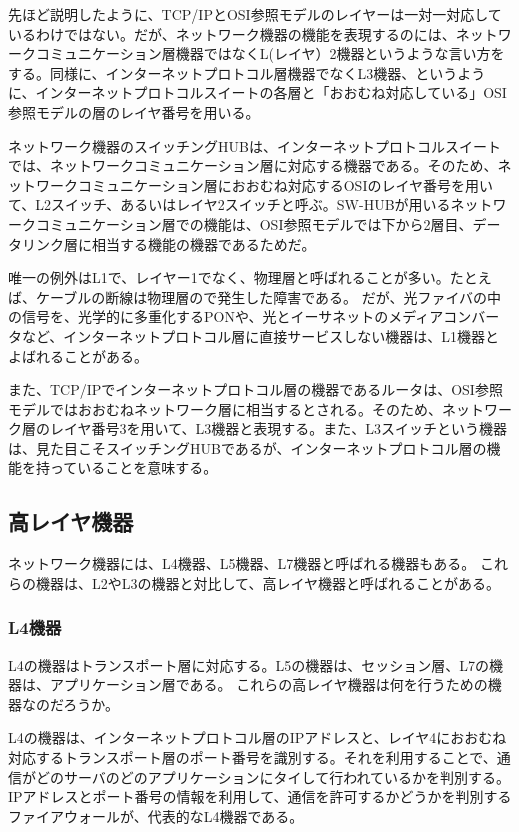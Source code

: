 先ほど説明したように、TCP/IPとOSI参照モデルのレイヤーは一対一対応しているわけではない。だが、ネットワーク機器の機能を表現するのには、ネットワークコミュニケーション層機器ではなくL(レイヤ）2機器というような言い方をする。同様に、インターネットプロトコル層機器でなくL3機器、というように、インターネットプロトコルスイートの各層と「おおむね対応している」OSI参照モデルの層のレイヤ番号を用いる。

ネットワーク機器のスイッチングHUBは、インターネットプロトコルスイートでは、ネットワークコミュニケーション層に対応する機器である。そのため、ネットワークコミュニケーション層におおむね対応するOSIのレイヤ番号を用いて、L2スイッチ、あるいはレイヤ2スイッチと呼ぶ。SW-HUBが用いるネットワークコミュニケーション層での機能は、OSI参照モデルでは下から2層目、データリンク層に相当する機能の機器であるためだ。

唯一の例外はL1で、レイヤー1でなく、物理層と呼ばれることが多い。たとえば、ケーブルの断線は物理層ので発生した障害である。
だが、光ファイバの中の信号を、光学的に多重化するPONや、光とイーサネットのメディアコンバータなど、インターネットプロトコル層に直接サービスしない機器は、L1機器とよばれることがある。

また、TCP/IPでインターネットプロトコル層の機器であるルータは、OSI参照モデルではおおむねネットワーク層に相当するとされる。そのため、ネットワーク層のレイヤ番号3を用いて、L3機器と表現する。また、L3スイッチという機器は、見た目こそスイッチングHUBであるが、インターネットプロトコル層の機能を持っていることを意味する。

\subsection{高レイヤ機器}

ネットワーク機器には、L4機器、L5機器、L7機器と呼ばれる機器もある。
これらの機器は、L2やL3の機器と対比して、高レイヤ機器と呼ばれることがある。

\subsubsection{L4機器}

L4の機器はトランスポート層に対応する。L5の機器は、セッション層、L7の機器は、アプリケーション層である。
これらの高レイヤ機器は何を行うための機器なのだろうか。

L4の機器は、インターネットプロトコル層のIPアドレスと、レイヤ4におおむね対応するトランスポート層のポート番号を識別する。それを利用することで、通信がどのサーバのどのアプリケーションにタイして行われているかを判別する。
IPアドレスとポート番号の情報を利用して、通信を許可するかどうかを判別するファイアウォールが、代表的なL4機器である。

